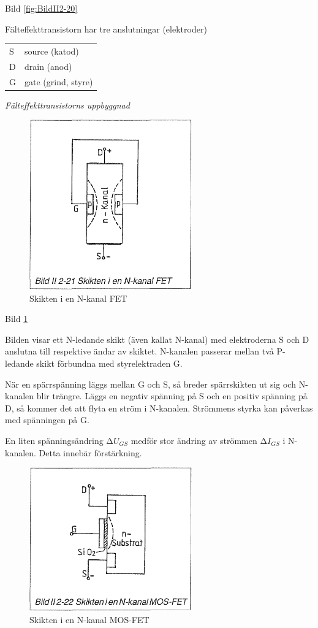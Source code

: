 Bild \ref{fig:BildII2-20}

Fälteffekttransistorn har tre anslutningar (elektroder)
\begin{tabular}{ll}
  S & source (katod) \\
  D & drain (anod) \\
  G & gate (grind, styre) \\
\end{tabular}

\emph{Fälteffekttransistorns uppbyggnad}

\begin{figure}[h]
\begin{center}
\includegraphics[width=7cm]{images/bild_2_2-21}
\caption{Skikten i en N-kanal FET}
\label{fig:BildII2-21}
\end{center}
\end{figure}

Bild \ref{fig:BildII2-21}

Bilden visar ett N-ledande skikt (även kallat N-kanal) med elektroderna S och D
anslutna till respektive ändar av skiktet. N-kanalen passerar mellan två
P-ledande skikt förbundna med styrelektraden G.

När en spärrspänning läggs mellan G och S, så breder spärrskikten ut sig och
N-kanalen blir trängre. Läggs en negativ spänning på S och en positiv spänning
på D, så kommer det att flyta en ström i N-kanalen. Strömmens styrka kan
påverkas med spänningen på G.

En liten spänningsändring \(∆U_{GS}\) medför stor ändring av strömmen
\(∆I_{GS}\) i N-kanalen. Detta innebär förstärkning.

\begin{figure}[h]
\begin{center}
\includegraphics[width=7cm]{images/bild_2_2-22}
\caption{Skikten i en N-kanal MOS-FET}
\label{fig:BildII2-22}
\end{center}
\end{figure}

